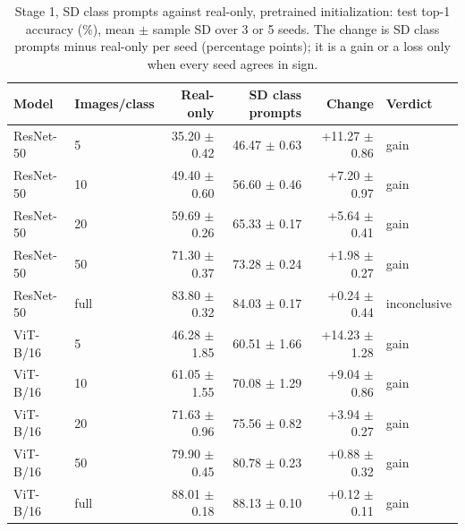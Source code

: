 \begin{table}[H]
\centering
\caption{Stage 1, SD class prompts against real-only, pretrained initialization: test top-1 accuracy (\%), mean $\pm$ sample SD over 3 or 5 seeds. The change is SD class prompts minus real-only per seed (percentage points); it is a gain or a loss only when every seed agrees in sign.}
\label{tab:stage1-pretrained-accuracy-sd_prompt-test}
\begin{tabular}{llrrrl}
\toprule
Model & Images/class & Real-only & SD class prompts & Change & Verdict \\
\midrule
ResNet-50 & 5 & 35.20 $\pm$ 0.42 & 46.47 $\pm$ 0.63 & +11.27 $\pm$ 0.86 & gain \\
ResNet-50 & 10 & 49.40 $\pm$ 0.60 & 56.60 $\pm$ 0.46 & +7.20 $\pm$ 0.97 & gain \\
ResNet-50 & 20 & 59.69 $\pm$ 0.26 & 65.33 $\pm$ 0.17 & +5.64 $\pm$ 0.41 & gain \\
ResNet-50 & 50 & 71.30 $\pm$ 0.37 & 73.28 $\pm$ 0.24 & +1.98 $\pm$ 0.27 & gain \\
ResNet-50 & full & 83.80 $\pm$ 0.32 & 84.03 $\pm$ 0.17 & +0.24 $\pm$ 0.44 & inconclusive \\
\midrule
ViT-B/16 & 5 & 46.28 $\pm$ 1.85 & 60.51 $\pm$ 1.66 & +14.23 $\pm$ 1.28 & gain \\
ViT-B/16 & 10 & 61.05 $\pm$ 1.55 & 70.08 $\pm$ 1.29 & +9.04 $\pm$ 0.86 & gain \\
ViT-B/16 & 20 & 71.63 $\pm$ 0.96 & 75.56 $\pm$ 0.82 & +3.94 $\pm$ 0.27 & gain \\
ViT-B/16 & 50 & 79.90 $\pm$ 0.45 & 80.78 $\pm$ 0.23 & +0.88 $\pm$ 0.32 & gain \\
ViT-B/16 & full & 88.01 $\pm$ 0.18 & 88.13 $\pm$ 0.10 & +0.12 $\pm$ 0.11 & gain \\
\bottomrule
\end{tabular}
\end{table}
